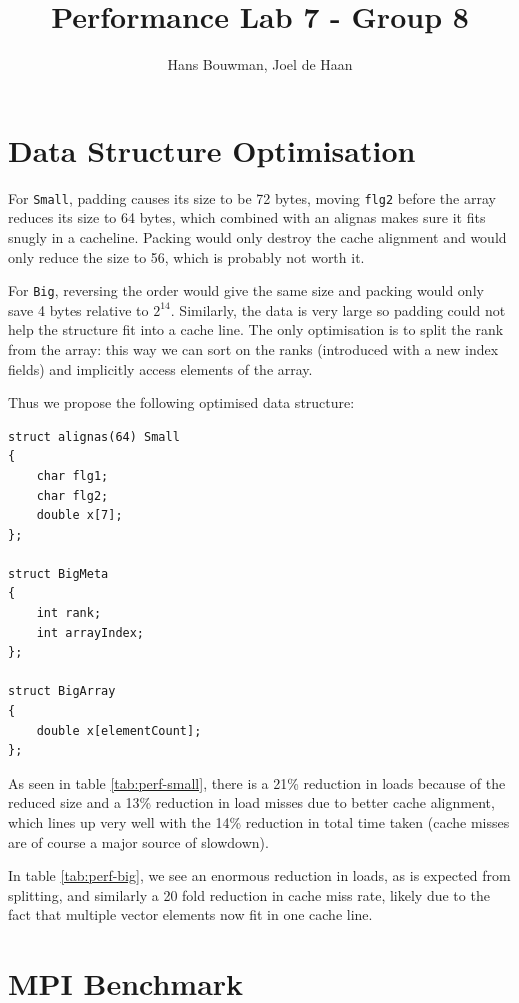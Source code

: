 \documentclass{article}
\title{Performance Lab 7 - Group 8}
\author{Hans Bouwman, Joel de Haan}
\begin{document}
\maketitle

\section{Data Structure Optimisation}

For \texttt{Small}, padding causes its size to be 72 bytes, moving \texttt{flg2} before the array reduces its size to 64 bytes, which combined with an alignas makes sure it fits snugly in a cacheline. Packing would only destroy the cache alignment and would only reduce the size to 56, which is probably not worth it.

For \texttt{Big}, reversing the order would give the same size and packing would only save 4 bytes relative to $2^14$. Similarly, the data is very large so padding could not help the structure fit into a cache line. The only optimisation is to split the rank from the array: this way we can sort on the ranks (introduced with a new index fields) and implicitly access elements of the array.

Thus we propose the following optimised data structure:

\begin{lstlisting}
struct alignas(64) Small
{
    char flg1;
    char flg2;
    double x[7];
};

struct BigMeta
{
    int rank;
    int arrayIndex;
};

struct BigArray
{
    double x[elementCount];
};
\end{lstlisting}


As seen in table \ref{tab:perf-small}, there is a 21\% reduction in loads because of the reduced size and a 13\% reduction in load misses due to better cache alignment, which lines up very well with the 14\% reduction in total time taken (cache misses are of course a major source of slowdown).

In table \ref{tab:perf-big}, we see an enormous reduction in loads, as is expected from splitting, and similarly a 20 fold reduction in cache miss rate, likely due to the fact that multiple vector elements now fit in one cache line.





\newpage

\section{MPI Benchmark}


\end{document}
